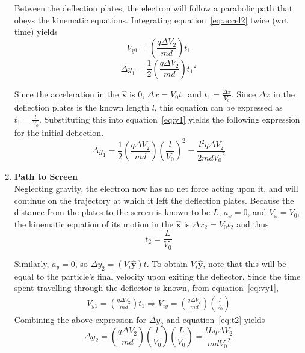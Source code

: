 \documentclass[twocolumn,english,amsmath,amssymb]{IEEEtran}
\theoremstyle{plain}
\theoremstyle{plain}
\begin{document}
\begin{enumerate}
 Between the deflection plates, the electron will follow a parabolic path that obeys the kinematic equations. Integrating equation~\ref{eq:accel2} twice (wrt time) yields
 \begin{equation} \label{eq:vy1}
  V_{y1} = (\frac{q\Delta V_2}{md})t_1
 \end{equation}
 \begin{equation} \label{eq:y1}
  \Delta y_1 = \frac{1}{2}(\frac{q\Delta V_2}{md}){t_1}^2
 \end{equation}

 Since the acceleration in the $\mathbf{\hat{x}}$ is 0, $\Delta x = V_0 t_1$ and $t_1=\frac{\Delta x}{V_o}.$ Since $\Delta x$ in the deflection plates is the known length $l$, this equation can be expressed as $t_1=\frac{l}{V_o}$. Substituting this into equation~\ref{eq:y1} yields the following expression for the initial deflection.
 \begin{equation} \label{eq:y1final}
  \Delta y_1 = \frac{1}{2}(\frac{q\Delta V_2}{md}){(\frac{l}{V_0})}^2 =\frac{l^2 q\Delta V_2}{2md{V_0}^2}
 \end{equation}

 \item \textbf{Path to Screen} \\
 Neglecting gravity, the electron now has no net force acting upon it, and will continue on the trajectory at which it left the deflection plates. Because the distance from the plates to the screen is known to be $L$, $a_x=0$, and $V_x=V_0$, the kinematic equation of its motion in the $\mathbf{\hat{x}}$ is $\Delta x_2=V_0 t_2$ and thus
 \begin{equation} \label{eq:t2}
 t_2 = \frac{L}{V_0}
 \end{equation}

 Similarly, $a_y=0$, so $\Delta y_2 = (V_i \mathbf{\hat{y}})t$. To obtain $V_i \mathbf{\hat{y}}$, note that this will be equal to the particle's final velocity upon exiting the deflector. Since the time spent travelling through the deflector is known, from equation~\ref{eq:vy1},
 \begin{align*}
  V_{y1} = (\frac{q\Delta V_2}{md})t_1 \Rightarrow V_{iy}= (\frac{q\Delta V_2}{md})(\frac{l}{V_0})
 \end{align*}
  Combining the above expression for $\Delta y_2$ and equation~\ref{eq:t2} yields
  \begin{equation} \label{eq:y2final}
   \Delta y_2 = (\frac{q\Delta V_2}{md})(\frac{l}{V_0})(\frac{L}{V_0}) = \frac{l L q\Delta V_2}{md{V_0}^2}
  \end{equation}


\end{enumerate}
\end{document}
